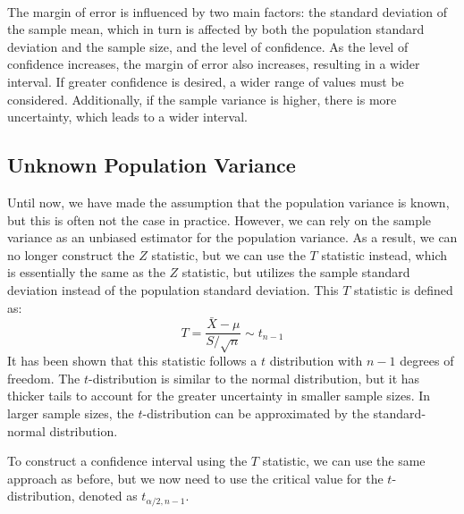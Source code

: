 \documentclass{./../../Latex/handout}
\begin{document}
  \\ 


The margin of error is influenced by two main factors: the standard deviation of the sample mean, which in turn is affected by both the population standard deviation and the sample size, and the level of confidence. As the level of confidence increases, the margin of error also increases, resulting in a wider interval. If greater confidence is desired, a wider range of values must be considered. Additionally, if the sample variance is higher, there is more uncertainty, which leads to a wider interval.

\subsection*{Unknown Population Variance}

Until now, we have made the assumption that the population variance is known, but this is often not the case in practice. However, we can rely on the sample variance as an unbiased estimator for the population variance. As a result, we can no longer construct the $Z$ statistic, but we can use the $T$ statistic instead, which is essentially the same as the $Z$ statistic, but utilizes the sample standard deviation instead of the population standard deviation. This $T$ statistic is defined as:
$$ T = \frac{\bar{X}-\mu}{S/\sqrt{n}} \sim t_{n-1} $$
It has been shown that this statistic follows a $t$ distribution with $n-1$ degrees of freedom. The $t$-distribution is similar to the normal distribution, but it has thicker tails to account for the greater uncertainty in smaller sample sizes. In larger sample sizes, the $t$-distribution can be approximated by the standard-normal distribution.

To construct a confidence interval using the $T$ statistic, we can use the same approach as before, but we now need to use the critical value for the $t$-distribution, denoted as $t_{\alpha/2,n-1}$. 

  \\ 
\end{document}
